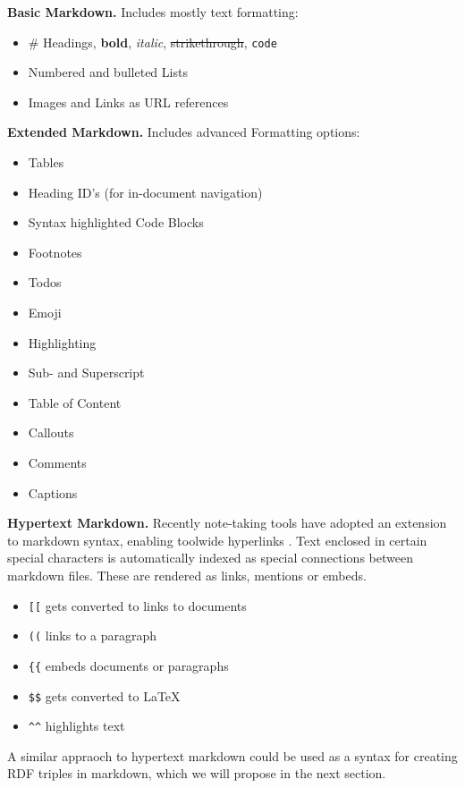 \textbf{Basic Markdown.} Includes mostly text formatting:
\begin{itemize}
    \item \# Headings, \textbf{bold}, \emph{italic}, \sout{strikethrough}, \verb|code|
    \item Numbered and bulleted Lists
    \item Images and Links as URL references
\end{itemize}
    
\textbf{Extended Markdown.} Includes advanced Formatting options:
\begin{itemize}
    \item Tables
    \item Heading ID’s (for in-document navigation)
    \item Syntax highlighted Code Blocks
    \item Footnotes
    \item Todos
    \item Emoji
    \item Highlighting
    \item Sub- and Superscript
    \item Table of Content
    \item Callouts
    \item Comments
    \item Captions
\end{itemize}
    
\textbf{Hypertext Markdown.} Recently note-taking tools have adopted an extension to markdown syntax, enabling toolwide hyperlinks \cite{notion, obsidian, roam,logseq}. Text enclosed in certain special characters is automatically indexed as special connections between markdown files. These are rendered as links, mentions or embeds.

\begin{itemize}
    \item \verb|[[| gets converted to links to documents
    \item \verb|((| links to a paragraph
    \item \verb|{{| embeds documents or paragraphs
    \item \verb|$$| gets converted to \LaTeX
    \item \verb|^^| highlights text
\end{itemize}
    
    

A similar appraoch to hypertext markdown could be used as a syntax for creating RDF triples in markdown, which we will propose in the next section.

